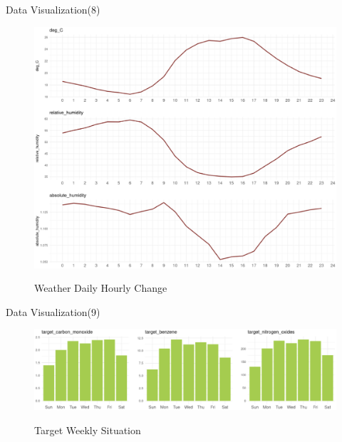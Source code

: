 \documentclass[
 size=14pt,
 paper=smartboard,  %
 mode=present, 		%
 display=slides, 	%
 style=tuliplab,  	%
 pauseslide,
 fleqn,leqno]{powerdot}
\begin{document}
\begin{slide}[toc=,bm=]{Data Visualization(8)}
	
	\begin{figure}
		\centering
		\includegraphics[scale=0.3]{figures//p8.eps}\\
		\caption{Weather Daily Hourly Change}\label{fig:Weather Daily Hourly Change}
	\end{figure}
	
\end{slide}

\begin{slide}[toc=,bm=]{Data Visualization(9)}
	
	\begin{figure}
		\centering
		\includegraphics[scale=0.45]{figures//p9.eps}\\
		\caption{Target Weekly Situation}\label{fig:Target Weekly Situation}
	\end{figure}
	
\end{slide}
\end{document}
